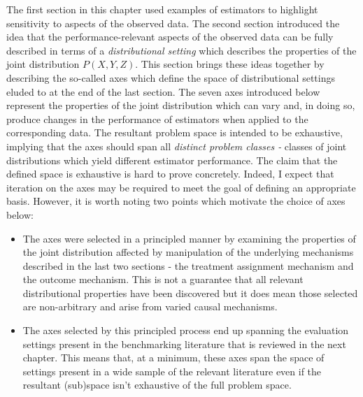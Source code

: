\documentclass[../main.tex]{subfiles}
\begin{document}
\vspace{\baselineskip}
The first section in this chapter used examples of estimators to highlight sensitivity to aspects of the observed data. The second section introduced the idea that the performance-relevant aspects of the observed data can be fully described in terms of a \textit{distributional setting} which describes the properties of the joint distribution  \( P \left( X, Y, Z \right)  \). This section brings these ideas together by describing the so-called axes which define the space of distributional settings eluded to at the end of the last section. The seven axes introduced below represent the properties of the joint distribution which can vary and, in doing so, produce changes in the performance of estimators when applied to the corresponding data. The resultant problem space is intended to be exhaustive, implying that the axes should span all \textit{distinct problem classes - }classes of joint distributions which yield different estimator performance. The claim that the defined space is exhaustive is hard to prove concretely. Indeed, I expect that iteration on the axes may be required to meet the goal of defining an appropriate basis. However, it is worth noting two points which motivate the choice of axes below:\par


\vspace{\baselineskip}
\begin{itemize}
	\item The axes were selected in a principled manner by examining the properties of the joint distribution affected by manipulation of the underlying mechanisms described in the last two sections - the treatment assignment mechanism and the outcome mechanism. This is not a guarantee that all relevant distributional properties have been discovered but it does mean those selected are non-arbitrary and arise from varied causal mechanisms.\par


\vspace{\baselineskip}
	\item The axes selected by this principled process end up spanning the evaluation settings present in the benchmarking literature that is reviewed in the next chapter. This means that, at a minimum, these axes span the space of settings present in a wide sample of the relevant literature even if the resultant (sub)space isn’t exhaustive of the full problem space.
\end{itemize}\par
\end{document}
